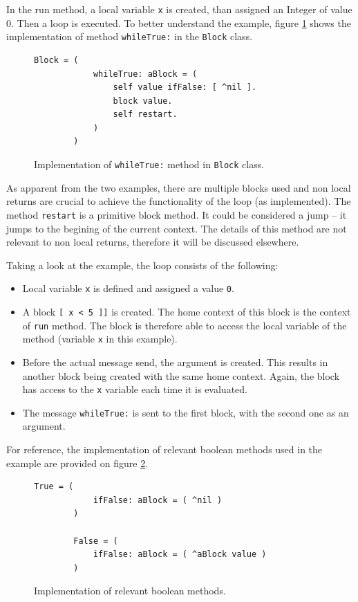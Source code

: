 \documentclass[thesis=M,english]{FITthesis}[2019/12/23]
\begin{document}
In the run method, a local variable \texttt{x} is created, than assigned an Integer of value 0. Then a loop is
executed. To better understand the example, figure \ref{fig:block_whileTrue} shows the implementation of method \texttt{whileTrue:} in the
\texttt{Block} class.

\begin{figure}[h!]
	\centering
	\begin{lstlisting}[language=Smalltalk]
		Block = (
			whileTrue: aBlock = (
				self value ifFalse: [ ^nil ].
				block value.
				self restart.
			)
		)
	\end{lstlisting}
	\caption{Implementation of \texttt{whileTrue:} method in \texttt{Block} class.}
	\label{fig:block_whileTrue}
\end{figure}

As apparent from the two examples, there are multiple blocks used and non local returns are crucial to achieve the functionality of the loop
(as implemented). The method \texttt{restart} is a primitive block method. It could be considered a jump -- it jumps to the begining of the current
context. The details of this method are not relevant to non local returns, therefore it will be discussed elsewhere.

Taking a look at the example, the loop consists of the following:
\begin{itemize}
	\item Local variable \texttt{x} is defined and assigned a value \texttt{0}.
	\item A block \texttt{[ x < 5 ]]} is created. The home context of this block is the context of \texttt{run} method. The block is therefore
		able to access the local variable of the method (variable \texttt{x} in this example).
	\item Before the actual message send, the argument is created. This results in another block being created with the same home context. Again, the block
		has access to the \texttt{x} variable each time it is evaluated.
	\item The message \texttt{whileTrue:} is sent to the first block, with the second one as an argument.
\end{itemize}

For reference, the implementation of relevant boolean methods used in the example are provided on figure \ref{fig:bool_ifFalse}.
\begin{figure}[h!]
	\begin{lstlisting}[language=Smalltalk]
		True = (
			ifFalse: aBlock = ( ^nil )
		)

		False = (
			ifFalse: aBlock = ( ^aBlock value )
		)
	\end{lstlisting}
	\caption{Implementation of relevant boolean methods.}
	\label{fig:bool_ifFalse}
\end{figure}
\end{document}
